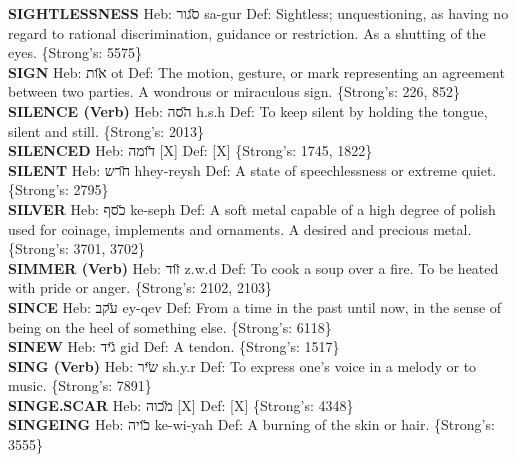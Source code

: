 {\textbf{SIGHTLESSNESS} Heb: {\large\H סגור} sa-gur Def: Sightless; unquestioning, as having no regard to rational discrimination, guidance or restriction. As a shutting of the eyes. \{Strong's: 5575\}\hfill{}\\

\textbf{SIGN} Heb: {\large\H אות} ot Def: The motion, gesture, or mark representing an agreement between two parties. A wondrous or miraculous sign. \{Strong's: 226, 852\}\hfill{}\\

\textbf{SILENCE (Verb)} Heb: {\large\H הסה} h.s.h Def: To keep silent by holding the tongue, silent and still. \{Strong's: 2013\}\hfill{}\\

\textbf{SILENCED} Heb: {\large\H דומה} {[}X{]} Def: {[}X{]} \{Strong's: 1745, 1822\}\hfill{}\\

\textbf{SILENT} Heb: {\large\H חרש} hhey-reysh Def: A state of speechlessness or extreme quiet. \{Strong's: 2795\}\hfill{}\\

\textbf{SILVER} Heb: {\large\H כסף} ke-seph Def: A soft metal capable of a high degree of polish used for coinage, implements and ornaments. A desired and precious metal. \{Strong's: 3701, 3702\}\hfill{}\\

\textbf{SIMMER (Verb)} Heb: {\large\H זוד} z.w.d Def: To cook a soup over a fire. To be heated with pride or anger. \{Strong's: 2102, 2103\}\hfill{}\\

\textbf{SINCE} Heb: {\large\H עקב} ey-qev Def: From a time in the past until now, in the sense of being on the heel of something else. \{Strong's: 6118\}\hfill{}\\

\textbf{SINEW} Heb: {\large\H גיד} gid Def: A tendon. \{Strong's: 1517\}\hfill{}\\

\textbf{SING (Verb)} Heb: {\large\H שיר} sh.y.r Def: To express one's voice in a melody or to music. \{Strong's: 7891\}\hfill{}\\

\textbf{SINGE.SCAR} Heb: {\large\H מכוה} {[}X{]} Def: {[}X{]} \{Strong's: 4348\}\hfill{}\\

\textbf{SINGEING} Heb: {\large\H כויה} ke-wi-yah Def: A burning of the skin or hair. \{Strong's: 3555\}\hfill{}\\

}
